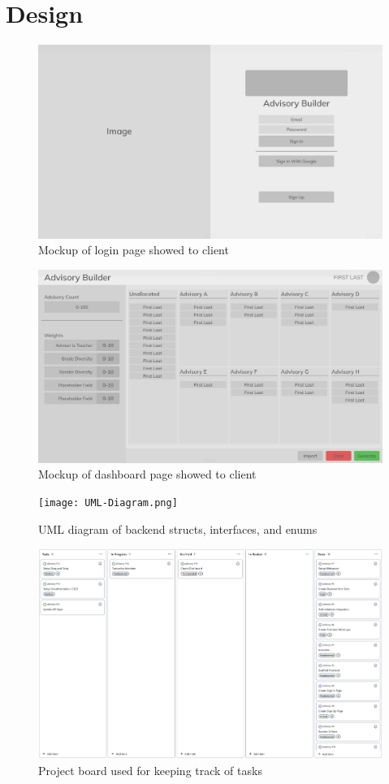 \documentclass[advisory-ia.tex]{subfiles}
\begin{document}
  \section{Design}
  \label{sec:design}
  \begin{figure}
    \includegraphics[width=\linewidth]{Login-Mockup}
    \caption{Mockup of login page showed to client}
    \label{design:login}
  \end{figure}
  \begin{figure}
    \includegraphics[width=\linewidth]{Dashboard-Mockup}
    \caption{Mockup of dashboard page showed to client}
    \label{design:dashboard}
  \end{figure}
  \begin{figure}
    \texttt{[image: UML-Diagram.png]}
    \caption{UML diagram of backend structs, interfaces, and enums}
    \label{design:uml}
  \end{figure}
  \begin{figure}
    \includegraphics[width=\linewidth]{Github-Project-Board}
    \caption{Project board used for keeping track of tasks}
    \label{design:project_board}
  \end{figure}
\end{document}
